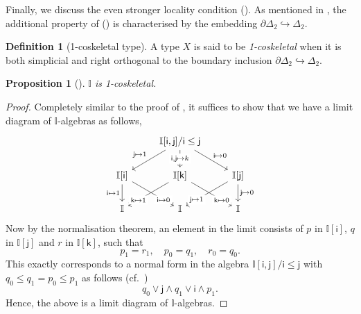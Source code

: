 \documentclass[a4paper,12pt]{amsart}
\newtheorem{proposition}[theorem]{Proposition}
\theoremstyle{definition}
\newtheorem{definition}[theorem]{Definition}
\newcommand{\mbb}[1]{\mathbb{#1}}
\newcommand{\I}{\mbb I}
\newcommand{\ms}[1]{\mathsf{#1}}
\newcommand{\hook}{\hookrightarrow}
\begin{document}
Finally, we discuss the even stronger locality condition (\AxiomOneCS). As mentioned in , the additional property of (\AxiomOneCS) is characterised by the embedding $\partial\Delta_2 \hook \Delta_2$.

\begin{definition}[1-coskeletal type]
  A type $X$ is said to be \emph{1-coskeletal} when it is both simplicial and right orthogonal to the boundary inclusion $\partial\Delta_2 \hook \Delta_2$.
\end{definition}

\begin{proposition}[\AxiomSQCF]\label{specis1t}
  $\I$ is 1-coskeletal.
\end{proposition}
\begin{proof}
  Completely similar to the proof of , it suffices to show that we have a limit diagram of $\I$-algebras as follows,
  \[\begin{tikzcd}
    & {\I[\ms{i},\ms{j}]/\ms{i}\le \ms{j}} \\
    \I[\ms{i}] & \I[\ms{k}] & \I[\ms{j}] \\
    \I & \I & \I
    \arrow["{\ms{j} \mapsto 1}"', from=1-2, to=2-1]
    \arrow["{\ms{i},\ms{j} \mapsto k}"{description}, from=1-2, to=2-2]
    \arrow["{\ms{i}\mapsto 0}", from=1-2, to=2-3]
    \arrow["\ms{i}\mapsto 1"', from=2-1, to=3-1]
    \arrow["\ms{i}\mapsto 0"{description, pos=0.75}, from=2-1, to=3-2]
    \arrow["\ms{k}\mapsto 1"{description, pos=0.75}, from=2-2, to=3-1]
    \arrow["\ms{k}\mapsto 0"{description, pos=0.75}, from=2-2, to=3-3]
    \arrow["\ms{j}\mapsto 1"{description, pos=0.75}, from=2-3, to=3-2]
    \arrow["\ms{j}\mapsto 0", from=2-3, to=3-3]
  \end{tikzcd}\]
  Now by the normalisation theorem, an element in the limit consists of $p$ in $\I[\ms{i}]$, $q$ in $\I[\ms{j}]$ and $r$ in $\I[\ms{k}]$, such that
  \[ p_1 = r_1, \quad p_0 = q_1, \quad r_0 = q_0\text{.} \]
  This exactly corresponds to a normal form in the algebra $\I[\ms{i},\ms{j}]/\ms{i}\le\ms{j}$ with $q_0 \le q_1 = p_0 \le p_1$ as follows (cf.\ )
  \[ q_0 \vee \ms{j} \wedge q_1 \vee \ms{i} \wedge p_1\text{.} \]
  Hence, the above is a limit diagram of $\I$-algebras.
\end{proof}
\end{document}
